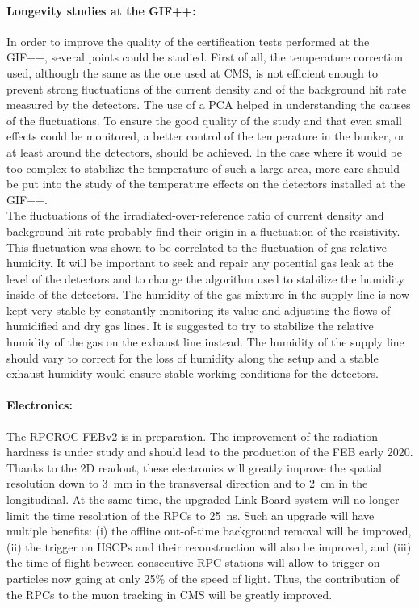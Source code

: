 	\paragraph*{Longevity studies at the GIF++:} In order to improve the quality of the certification tests performed at the GIF++, several points could be studied. First of all, the temperature correction used, although the same as the one used at CMS, is not efficient enough to prevent strong fluctuations of the current density and of the background hit rate measured by the detectors. The use of a \acl{PCA} helped in understanding the causes of the fluctuations. To ensure the good quality of the study and that even small effects could be monitored, a better control of the temperature in the bunker, or at least around the detectors, should be achieved. In the case where it would be too complex to stabilize the temperature of such a large area, more care should be put into the study of the temperature effects on the detectors installed at the GIF++.\\
	The fluctuations of the irradiated-over-reference ratio of current density and background hit rate probably find their origin in a fluctuation of the resistivity. This fluctuation was shown to be correlated to the fluctuation of gas relative humidity. It will be important to seek and repair any potential gas leak at the level of the detectors and to change the algorithm used to stabilize the humidity inside of the detectors. The humidity of the gas mixture in the supply line is now kept very stable by constantly monitoring its value and adjusting the flows of humidified and dry gas lines. It is suggested to try to stabilize the relative humidity of the gas on the exhaust line instead. The humidity of the supply line should vary to correct for the loss of humidity along the setup and a stable exhaust humidity would ensure stable working conditions for the detectors.
	
	\paragraph*{Electronics:} The RPCROC FEBv2 is in preparation. The improvement of the radiation hardness is under study and should lead to the production of the FEB early 2020. Thanks to the 2D readout, these electronics will greatly improve the spatial resolution down to \SI{3}{mm} in the transversal direction and to \SI{2}{cm} in the longitudinal. At the same time, the upgraded Link-Board system will no longer limit the time resolution of the RPCs to \SI{25}{ns}. Such an upgrade will have multiple benefits: (i) the offline out-of-time background removal will be improved, (ii) the trigger on HSCPs and their reconstruction will also be improved, and (iii) the time-of-flight between consecutive RPC stations will allow to trigger on particles now going at only 25\% of the speed of light. Thus, the contribution of the RPCs to the muon tracking in CMS will be greatly improved.
	
